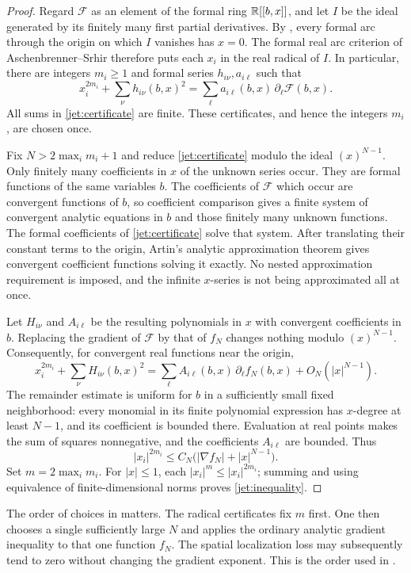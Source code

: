 \begin{proof}
Regard $\mathcal F$ as an element of the formal ring $\mathbb R[[b,x]]$, and let $I$ be the ideal generated by its finitely many first partial derivatives. By , every formal arc through the origin on which $I$ vanishes has $x=0$. The formal real arc criterion of Aschenbrenner--Srhir \cite[Corollary~4.8]{AS2024} therefore puts each $x_i$ in the real radical of $I$. In particular, there are integers $m_i\geq1$ and formal series $h_{i\nu},a_{i\ell}$ such that
\begin{equation}\label{jet:certificate}
 x_i^{2m_i}+\sum_\nu h_{i\nu}(b,x)^2
   =\sum_\ell a_{i\ell}(b,x)\,\partial_\ell\mathcal F(b,x).
\end{equation}
All sums in \eqref{jet:certificate} are finite. These certificates, and hence the integers $m_i$, are chosen once.

Fix $N>2\max_i m_i+1$ and reduce \eqref{jet:certificate} modulo the ideal $(x)^{N-1}$. Only finitely many coefficients in $x$ of the unknown series occur. They are formal functions of the same variables $b$. The coefficients of $\mathcal F$ which occur are convergent functions of $b$, so coefficient comparison gives a finite system of convergent analytic equations in $b$ and those finitely many unknown functions. The formal coefficients of \eqref{jet:certificate} solve that system. After translating their constant terms to the origin, Artin's analytic approximation theorem \cite[Theorem~1.2]{Artin1968} gives convergent coefficient functions solving it exactly. No nested approximation requirement is imposed, and the infinite $x$-series is not being approximated all at once.

Let $H_{i\nu}$ and $A_{i\ell}$ be the resulting polynomials in $x$ with convergent coefficients in $b$. Replacing the gradient of $\mathcal F$ by that of $f_N$ changes nothing modulo $(x)^{N-1}$. Consequently, for convergent real functions near the origin,
\begin{equation}\label{jet:analytic-certificate}
 x_i^{2m_i}+\sum_\nu H_{i\nu}(b,x)^2
 =\sum_\ell A_{i\ell}(b,x)\,\partial_\ell f_N(b,x)
       +O_N(|x|^{N-1}).
\end{equation}
The remainder estimate is uniform for $b$ in a sufficiently small fixed neighborhood: every monomial in its finite polynomial expression has $x$-degree at least $N-1$, and its coefficient is bounded there. Evaluation at real points makes the sum of squares nonnegative, and the coefficients $A_{i\ell}$ are bounded. Thus
\[
 |x_i|^{2m_i}\leq C_N\bigl(|\nabla f_N|+|x|^{N-1}\bigr).
\]
Set $m=2\max_i m_i$. For $|x|\leq1$, each $|x_i|^m\leq|x_i|^{2m_i}$; summing and using equivalence of finite-dimensional norms proves \eqref{jet:inequality}.
\end{proof}

The order of choices in  matters. The radical certificates fix $m$ first. One then chooses a single sufficiently large $N$ and applies the ordinary analytic gradient inequality to that one function $f_N$. The spatial localization loss may subsequently tend to zero without changing the gradient exponent. This is the order used in .
